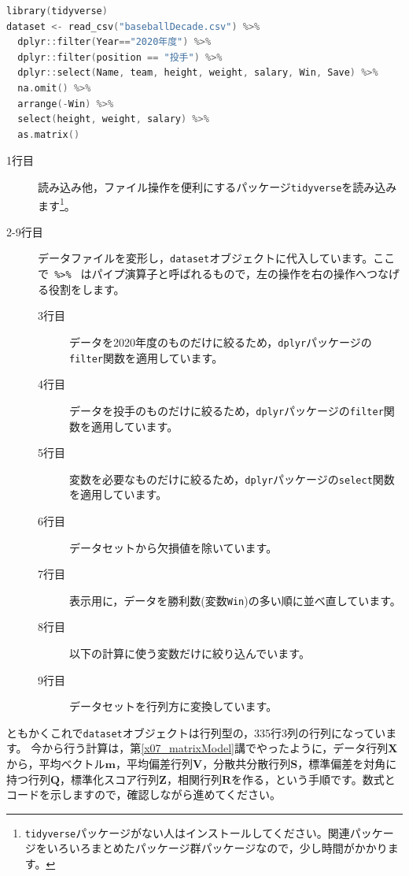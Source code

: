\documentclass{ltjsbook}
\begin{document}
\begin{lstlisting}[language=c++,label={code:09_06},caption={データファイルの読み込み}]
library(tidyverse)
dataset <- read_csv("baseballDecade.csv") %>%
  dplyr::filter(Year=="2020年度") %>% 
  dplyr::filter(position == "投手") %>%
  dplyr::select(Name, team, height, weight, salary, Win, Save) %>%
  na.omit() %>%
  arrange(-Win) %>% 
  select(height, weight, salary) %>%
  as.matrix() 
\end{lstlisting}
\begin{description}
	\item[1行目] 読み込み他，ファイル操作を便利にするパッケージ\texttt{tidyverse}を読み込みます\footnote{\texttt{tidyverse}パッケージがない人はインストールしてください。関連パッケージをいろいろまとめたパッケージ群パッケージなので，少し時間がかかります。}。
	\item[2-9行目] データファイルを変形し，\texttt{dataset}オブジェクトに代入しています。ここで\verb| %>% | はパイプ演算子と呼ばれるもので，左の操作を右の操作へつなげる役割をします。
	      \begin{description}
		      \item[3行目] データを2020年度のものだけに絞るため，\verb|dplyr|パッケージの\verb|filter|関数を適用しています。
		      \item[4行目] データを投手のものだけに絞るため，\verb|dplyr|パッケージの\verb|filter|関数を適用しています。
		      \item[5行目] 変数を必要なものだけに絞るため，\verb|dplyr|パッケージの\verb|select|関数を適用しています。
		      \item[6行目] データセットから欠損値を除いています。
		      \item[7行目] 表示用に，データを勝利数(変数\verb|Win|)の多い順に並べ直しています。
		      \item[8行目] 以下の計算に使う変数だけに絞り込んでいます。
		      \item[9行目] データセットを行列方に変換しています。
	      \end{description}
\end{description}

ともかくこれで\texttt{dataset}オブジェクトは行列型の，335行3列の行列になっています。
今から行う計算は，第\ref{x07_matrixModel}講でやったように，データ行列$\bm{X}$から，平均ベクトル$\bm{m}$，平均偏差行列$\bm{V}$，分散共分散行列$\bm{S}$，標準偏差を対角に持つ行列$\bm{Q}$，標準化スコア行列$\bm{Z}$，相関行列$\bm{R}$を作る，という手順です。数式とコードを示しますので，確認しながら進めてください。
\end{document}
